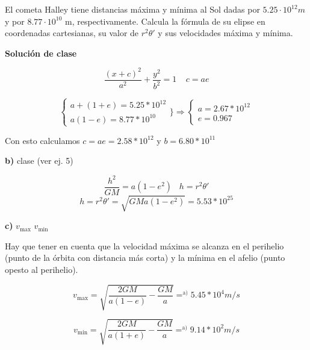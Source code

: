 \begin{problem}[7]
El cometa Halley tiene distancias máxima y mínima al Sol dadas por $5.25\cdot 10^{12} m$ y por $8.77\cdot10^{10}$ m, respectivamente. Calcula la fórmula de su elipse en coordenadas cartesianas, su valor de $r^2\theta'$ y sus velocidades máxima y mínima.

\solution

\textbf{Solución de clase}

$$ \frac{(x+c)^2}{a^2} + \frac{y^2}{b^2} =  1 \;\;\;\; c = a e $$

$$ \begin{cases}
		a + (1+e) = 5.25 * 10^{12} \\
		a(1-e) = 8.77 * 10^{10}
	\end{cases} \} \Rightarrow \begin{cases}
		a = 2.67 * 10^{12} \\
		e = 0.967
	\end{cases}$$

	Con esto calculamos $c = a e = 2.58 * 10^{12}$ y $b = 6.80 * 10^{11}$

\textbf{b)} clase (ver ej. 5)

$$ \frac{h^2}{GM} = a(1- e^2) \;\;\; h = r^2 \theta' $$
$$ h = r^2 \theta' = \sqrt{GMa(1 - e^2)} = 5.53 * 10^{25} $$

\textbf{c)} $v_{\text{max}}$  $ v_{\text{min}}$

Hay que tener en cuenta que la velocidad máxima se alcanza en el perihelio (punto de la órbita con distancia más corta) y la mínima en el afelio (punto opesto al perihelio).

$$ v_{\text{max}} = \sqrt{\frac{2GM}{a(1-e)} - \frac{GM}{a}} =^{\text{a)}} 5.45 * 10^4 m/s $$

$$ v_{\text{min}} = \sqrt{\frac{2GM}{a(1+e)} - \frac{GM}{a}} =^{\text{a)}} 9.14 * 10^2 m/s $$

\end{problem}

